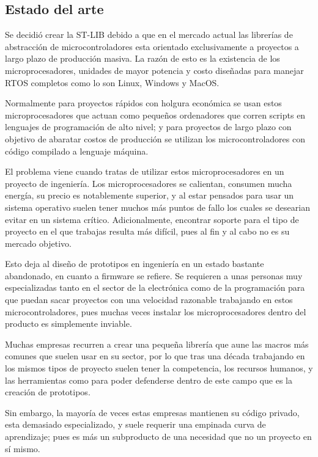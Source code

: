 \documentclass{report}
\begin{document}
\subsection{Estado del arte}
Se decidió crear la ST-LIB debido a que en el mercado actual las librerías de abstracción de microcontroladores esta orientado exclusivamente a proyectos a largo plazo de producción masiva. La razón de esto es la existencia de los microprocesadores, unidades de mayor potencia y costo diseñadas para manejar RTOS completos como lo son Linux, Windows y MacOS. \par
Normalmente para proyectos rápidos con holgura económica se usan estos microprocesadores que actuan como pequeños ordenadores que corren scripts en lenguajes de programación de alto nivel; y para proyectos de largo plazo con objetivo de abaratar costos de producción se utilizan los microcontroladores con código compilado a lenguaje máquina. 
\par \vspace{0.3cm}  
El problema viene cuando tratas de utilizar estos microprocesadores en un proyecto de ingeniería. Los microprocesadores se calientan, consumen mucha energía, su precio es notablemente superior, y al estar pensados para usar un sistema operativo suelen tener muchos más puntos de fallo los cuales se desearian evitar en un sistema crítico. Adicionalmente, encontrar soporte para el tipo de proyecto en el que trabajas resulta más difícil, pues al fin y al cabo no es su mercado objetivo.
\par \vspace{0.3cm}
Esto deja al diseño de prototipos en ingeniería en un estado bastante abandonado, en cuanto a firmware se refiere. Se requieren a unas personas muy especializadas tanto en el sector de la electrónica como de la programación para que puedan sacar proyectos con una velocidad razonable trabajando en estos microcontroladores, pues muchas veces instalar los microprocesadores dentro del producto es simplemente inviable. \par
Muchas empresas recurren a crear una pequeña librería que aune las macros más comunes que suelen usar en su sector, por lo que tras una década trabajando en los mismos tipos de proyecto suelen tener la competencia, los recursos humanos, y las herramientas como para poder defenderse dentro de este campo que es la creación de prototipos. \par
Sin embargo, la mayoría de veces estas empresas mantienen su código privado, esta demasiado especializado, y suele requerir una empinada curva de aprendizaje; pues es más un subproducto de una necesidad que no un proyecto en sí mismo. \par \vspace{0.3cm}
\end{document}
